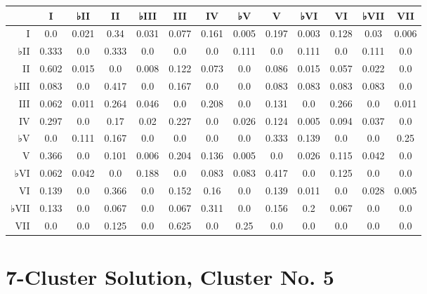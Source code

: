 \begin{table}[htbp]
\begin{minipage}{\linewidth}
\setlength{\tymax}{0.5\linewidth}
\centering
\small
\begin{tabulary}{\textwidth}{@{}RCCCCCCCCCCCC@{}} \toprule
&I&♭II&II&♭III&III&IV&♭V&V&♭VI&VI&♭VII&VII\\
\midrule
I&0.0&0.021&0.34&0.031&0.077&0.161&0.005&0.197&0.003&0.128&0.03&0.006\\
♭II&0.333&0.0&0.333&0.0&0.0&0.0&0.111&0.0&0.111&0.0&0.111&0.0\\
II&0.602&0.015&0.0&0.008&0.122&0.073&0.0&0.086&0.015&0.057&0.022&0.0\\
♭III&0.083&0.0&0.417&0.0&0.167&0.0&0.0&0.083&0.083&0.083&0.083&0.0\\
III&0.062&0.011&0.264&0.046&0.0&0.208&0.0&0.131&0.0&0.266&0.0&0.011\\
IV&0.297&0.0&0.17&0.02&0.227&0.0&0.026&0.124&0.005&0.094&0.037&0.0\\
♭V&0.0&0.111&0.167&0.0&0.0&0.0&0.0&0.333&0.139&0.0&0.0&0.25\\
V&0.366&0.0&0.101&0.006&0.204&0.136&0.005&0.0&0.026&0.115&0.042&0.0\\
♭VI&0.062&0.042&0.0&0.188&0.0&0.083&0.083&0.417&0.0&0.125&0.0&0.0\\
VI&0.139&0.0&0.366&0.0&0.152&0.16&0.0&0.139&0.011&0.0&0.028&0.005\\
♭VII&0.133&0.0&0.067&0.0&0.067&0.311&0.0&0.156&0.2&0.067&0.0&0.0\\
VII&0.0&0.0&0.125&0.0&0.625&0.0&0.25&0.0&0.0&0.0&0.0&0.0\\

\bottomrule

\end{tabulary}
\end{minipage}
\end{table}

\section{7-Cluster Solution, Cluster No. 5}
\label{7-clustersolutionclusterno.5}

